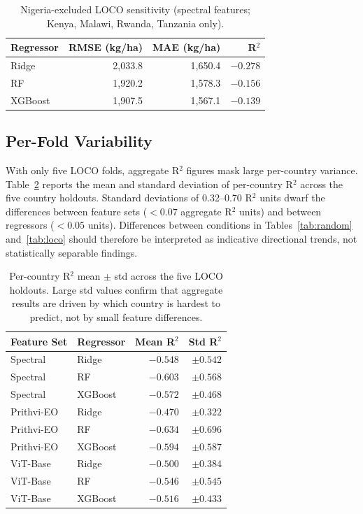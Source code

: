 \documentclass[journal]{IEEEtran}
\begin{document}
\begin{table}[!t]
  \centering
  \caption{Nigeria-excluded LOCO sensitivity (spectral features;
           Kenya, Malawi, Rwanda, Tanzania only).}
  \label{tab:nng}
  \begin{tabular}{lrrr}
    \toprule
    Regressor & RMSE (kg/ha) & MAE (kg/ha) & R$^2$ \\
    \midrule
    Ridge     & 2{,}033.8    & 1{,}650.4   & $-0.278$ \\
    RF        & 1{,}920.2    & 1{,}578.3   & $-0.156$ \\
    XGBoost   & 1{,}907.5    & 1{,}567.1   & $-0.139$ \\
    \bottomrule
  \end{tabular}
\end{table}

\subsection{Per-Fold Variability}

With only five LOCO folds, aggregate R$^2$ figures mask large
per-country variance.
Table~\ref{tab:foldstd} reports the mean and standard deviation of
per-country R$^2$ across the five country holdouts.
Standard deviations of 0.32--0.70 R$^2$ units dwarf the differences
between feature sets ($<0.07$ aggregate R$^2$ units) and between
regressors ($<0.05$ units).
Differences between conditions in Tables~\ref{tab:random}
and~\ref{tab:loco} should therefore be interpreted as indicative
directional trends, not statistically separable findings.

\begin{table}[!t]
  \centering
  \caption{Per-country R$^2$ mean $\pm$ std across the five LOCO holdouts.
           Large std values confirm that aggregate results are driven by
           which country is hardest to predict, not by small feature differences.}
  \label{tab:foldstd}
  \setlength{\tabcolsep}{4pt}
  \begin{tabular}{llrr}
    \toprule
    Feature Set & Regressor & Mean R$^2$ & Std R$^2$ \\
    \midrule
    Spectral    & Ridge     & $-0.548$ & $\pm 0.542$ \\
    Spectral    & RF        & $-0.603$ & $\pm 0.568$ \\
    Spectral    & XGBoost   & $-0.572$ & $\pm 0.468$ \\
    \midrule
    Prithvi-EO  & Ridge     & $-0.470$ & $\pm 0.322$ \\
    Prithvi-EO  & RF        & $-0.634$ & $\pm 0.696$ \\
    Prithvi-EO  & XGBoost   & $-0.594$ & $\pm 0.587$ \\
    \midrule
    ViT-Base    & Ridge     & $-0.500$ & $\pm 0.384$ \\
    ViT-Base    & RF        & $-0.546$ & $\pm 0.545$ \\
    ViT-Base    & XGBoost   & $-0.516$ & $\pm 0.433$ \\
    \bottomrule
  \end{tabular}
\end{table}
\end{document}
